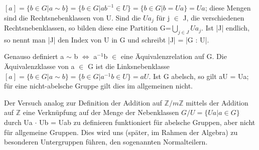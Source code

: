 \documentclass[fontsize=10pt]{scrartcl}
\begin{document}
$[a]=\{ b \in G | a \sim b \} = \{ b \in G | ab^{-1} \in U \} = \{ b \in G | b = Ua \} = Ua$; 
diese Mengen sind die Rechtsnebenklassen von U. Sind die $Ua_j$ für j $\in$ J, die verschiedenen Rechtsnebenklassen, so bilden diese eine Partition G=$\bigcup\limits_{j \in J} Ua_j$.
Ist |J| endlich, so nennt man |J| den Index von U in G und schreibt |J| = |G : U|.
\begin{compactitem}
\item Genauso definiert a $\sim$ b $\Leftrightarrow$ a$^{-1}$b $\in$ eine Äquivalenzrelation auf G. Die Äquivalenzklasse von a $\in$ G ist die Linksnebenklasse $[a] = \{b \in G | a \sim b \} = \{ b \in G | a^{-1}b \in U \} = aU$. 
Ist G abelsch, so gilt aU = Ua; für eine nicht-abelsche Gruppe gilt dies im allgemeinen nicht.
\item Der Versuch analog zur Definition der Addition auf $\mathbb{Z}/m\mathbb{Z}$ mittels der Addition auf $\mathbb{Z}$ eine Verknüpfung auf der Menge der Nebenklassen $G/U = \{Ua | a \in G\}$ durch Ua $\cdot$ Ub = Uab zu definieren funktioniert für abelsche Gruppen, aber nicht für allgemeine Gruppen. Dies wird uns (später, im Rahmen der Algebra) zu besonderen Untergruppen führen, den sogenannten Normalteilern.
\end{compactitem}
\end{document}

